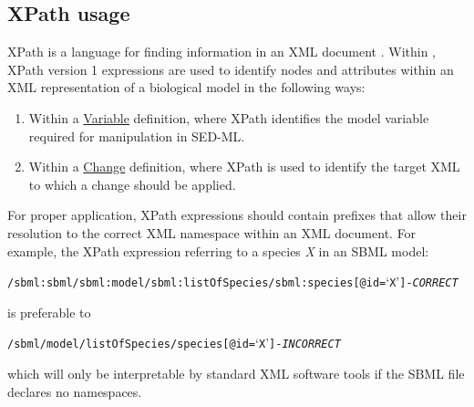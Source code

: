 \subsection{XPath usage}  

\label{sec:xpath} 
XPath is a language for finding information in an XML document \cite{xpath:1999}. Within \LoneVone, XPath version 1 expressions are  used to identify nodes and attributes within an XML representation of a biological model in the following ways:
%
\begin{enumerate}
\item {Within a \hyperref[class:variable]{Variable} definition, where XPath identifies the model variable required for manipulation in SED-ML.}
\item {Within a  \hyperref[class:change]{Change} definition, where XPath is used to identify the target XML to which a change should be applied.} 

\end{enumerate}

For proper application, XPath expressions should contain prefixes that allow their resolution to the correct XML namespace within an XML document. For example, the XPath expression referring to a species \emph{X} in an SBML model:
\begin{alltt}
/sbml:sbml/sbml:model/sbml:listOfSpecies/sbml:species[@id=`X'] {\color{green} \tickYes -\emph{CORRECT}}
\end{alltt}
is preferable to 
\begin{alltt}
/sbml/model/listOfSpecies/species[@id=`X'] {\color{red} \tickNo -\emph{INCORRECT} }
\end{alltt}

which will only be interpretable by standard XML software tools  if the SBML file declares no namespaces. 




